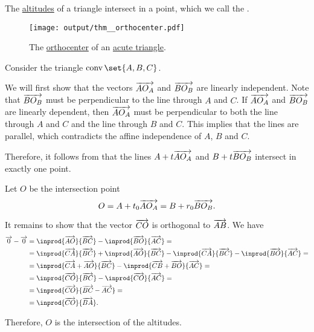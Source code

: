 \begin{proposition}\label{thm:orthocenter}\mimprovised
  The \hyperref[def:triangle_altitude]{altitudes} of a triangle intersect in a point, which we call the .

  \begin{figure}[!ht]
    \centering
    \texttt{[image: output/thm\_\_orthocenter.pdf]}
    \caption{The \hyperref[thm:orthocenter]{orthocenter} of an \hyperref[def:triangle/acute]{acute triangle}.}\label{fig:thm:orthocenter}
  \end{figure}
\end{proposition}
\begin{defproof}
  Consider the triangle \( \conv\set{ A, B, C } \).

  We will first show that the vectors \( \overrightarrow{A O_A} \) and \( \overrightarrow{B O_B} \) are linearly independent. Note that \( \overrightarrow{B O_B} \) must be perpendicular to the line through \( A \) and \( C \). If \( \overrightarrow{A O_A} \) and \( \overrightarrow{B O_B} \) are linearly dependent, then  \( \overrightarrow{A O_A} \) must be perpendicular to both the line through \( A \) and \( C \) and the line through \( B \) and \( C \). This implies that the lines are parallel, which contradicts the affine independence of \( A \), \( B \) and \( C \).

  Therefore, it follows from  that the lines \( A + t \overrightarrow{A O_A} \) and \( B + t \overrightarrow{B O_B} \) intersect in exactly one point.

  Let \( O \) be the intersection point
  \begin{equation*}
    O = A + t_0 \overrightarrow{A O_A} = B + r_0 \overrightarrow{B O_B}.
  \end{equation*}

  It remains to show that the vector \( \overrightarrow{CO} \) is orthogonal to \( \overrightarrow{AB} \). We have
  \begin{align*}
    \vect 0 - \vect 0
    &=
    \inprod {\vect{AO}} {\vect{BC}} - \inprod {\vect{BO}} {\vect{AC}}
    = \\ &=
    \inprod {\vect{CA}} {\vect{BC}} + \inprod {\vect{AO}} {\vect{BC}} - \inprod {\vect{CA}} {\vect{BC}} - \inprod {\vect{BO}} {\vect{AC}}
    = \\ &=
    \inprod {\vect{CA} + \vect{AO}} {\vect{BC}} - \inprod {\vect{CB} + \vect{BO}} {\vect{AC}}
    = \\ &=
    \inprod {\vect{CO}} {\vect{BC}} - \inprod {\vect{CO}} {\vect{AC}}
    = \\ &=
    \inprod {\vect{CO}} {\vect{BC} - \vect{AC}}
    = \\ &=
    \inprod {\vect{CO}} {\vect{BA}}.
  \end{align*}

  Therefore, \( O \) is the intersection of the altitudes.
\end{defproof}

